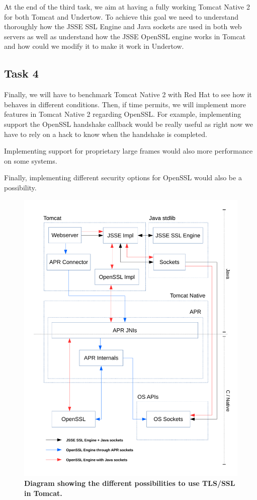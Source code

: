 \documentclass[11pt,a4paper,bibliography=totocnumbered]{scrartcl}
\def\mytitle{Tomcat Native 2}
\begin{document}
At the end of the third task, we aim at having a fully working \mytitle{} for both Tomcat and Undertow. To achieve this goal we need to understand thoroughly how the JSSE SSL Engine and Java sockets are used in both web servers as well as understand how the JSSE OpenSSL engine works in Tomcat and how could we modify it to make it work in Undertow.

\subsection{Task 4}
\label{subsec:task4}

Finally, we will have to benchmark \mytitle{} with Red Hat to see how it behaves in different conditions. Then, if time permits, we will implement more features in \mytitle{} regarding OpenSSL. For example, implementing support the OpenSSL handshake callback would be really useful as right now we have to rely on a hack to know when the handshake is completed.

Implementing support for proprietary large frames would also more performance on some systems.

Finally, implementing different security options for OpenSSL would also be a possibility.
\newpage
\printbibliography

\begin{figure}[!h]
\begin{center}
\includegraphics[scale=0.7]{diagram_current_way.pdf}
\end{center}
\caption{\textbf{Diagram showing the different possibilities to use TLS/SSL in Tomcat.}}
\label{fig:current}
\end{figure}
\end{document}
